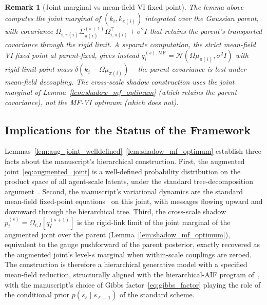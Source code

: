 \documentclass[11pt]{article}
\newtheorem{remark}{Remark}
\begin{document}
\begin{remark}[Joint marginal vs mean-field VI fixed point]
\label{rem:shadow_marginal_vs_mf}
The lemma above computes the joint marginal of $(k_i, k_{\pi(i)})$ integrated over the Gaussian parent, with covariance $\Omega_{i,\pi(i)} \Sigma_{\pi(i)}^{(s+1)} \Omega_{i,\pi(i)}^\top + \sigma^2 I$ that retains the parent's transported covariance through the rigid limit. A separate computation, the strict mean-field VI fixed point at parent-fixed, gives instead $q_i^{(s),\mathrm{MF}} = \mathcal{N}(\Omega \mu_{\pi(i)}, \sigma^2 I)$ with rigid-limit point mass $\delta(k_i - \Omega \mu_{\pi(i)})$ -- the parent covariance is lost under mean-field decoupling. The cross-scale shadow construction uses the joint marginal of Lemma~\ref{lem:shadow_mf_optimum} (which retains the parent covariance), not the MF-VI optimum (which does not).
\end{remark}

\subsection{Implications for the Status of the Framework}

Lemmas~\ref{lem:aug_joint_welldefined}--\ref{lem:shadow_mf_optimum} establish three facts about the manuscript's hierarchical construction. First, the augmented joint~\eqref{eq:augmented_joint} is a well-defined probability distribution on the product space of all agent-scale latents, under the standard tree-decomposition argument~\cite[\S3.2]{Lauritzen1996}. Second, the manuscript's variational dynamics are the standard mean-field fixed-point equations~\cite[Prop.~4.1]{Wainwright2008} on this joint, with messages flowing upward and downward through the hierarchical tree. Third, the cross-scale shadow $p_i^{(s)} = \Omega_{i,I}[q_I^{(s+1)}]$ is the rigid-link limit of the joint marginal of the augmented joint over the parent (Lemma~\ref{lem:shadow_mf_optimum}), equivalent to the gauge pushforward of the parent posterior, exactly recovered as the augmented joint's level-$s$ marginal when within-scale couplings are zeroed. The construction is therefore a hierarchical generative model with a specified mean-field reduction, structurally aligned with the hierarchical-AIF program of~\cite{Friston2017, parr2022active}, with the manuscript's choice of Gibbs factor~\eqref{eq:gibbs_factor} playing the role of the conditional prior $p(s_\ell \mid s_{\ell+1})$ of the standard scheme.
\end{document}
